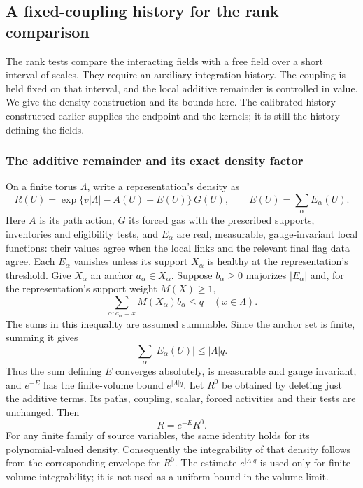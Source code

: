 \subsection{A fixed-coupling history for the rank comparison}
\label{sec:restarted-rank-history}

The rank tests compare the interacting fields with a free field over a
short interval of scales. They require an auxiliary integration history.
The coupling is held fixed on that interval, and the local additive
remainder is controlled in value. We give the density construction and
its bounds here. The calibrated history constructed earlier supplies the
endpoint and the kernels; it is still the history defining the fields.

\subsubsection{The additive remainder and its exact density factor}

On a finite torus $\Lambda$, write a representation's density as
\[
 R(U)=\exp\{v|\Lambda|-A(U)-E(U)\}\,G(U),
 \qquad E(U)=\sum_\alpha E_\alpha(U).
\]
Here $A$ is its path action, $G$ its forced gas with the prescribed
supports, inventories and eligibility tests, and $E_\alpha$ are real,
measurable, gauge-invariant local functions: their values agree when the local links and the relevant final flag data agree. Each $E_\alpha$ vanishes
unless its support $X_\alpha$ is healthy at the representation's threshold.
Give $X_\alpha$ an anchor $a_\alpha\in X_\alpha$. Suppose $b_\alpha\ge0$
majorizes $|E_\alpha|$ and, for the representation's support weight
$M(X)\ge1$,
\begin{equation}\label{eq:restart-anchored}
 \sum_{\alpha:a_\alpha=x}M(X_\alpha)b_\alpha\le q
 \quad(x\in\Lambda).
\end{equation}
The sums in this inequality are assumed summable. Since the anchor set
is finite, summing it gives
\[
 \sum_\alpha |E_\alpha(U)|\le |\Lambda|q.
\]
Thus the sum defining $E$ converges absolutely, is measurable and gauge
invariant, and $e^{-E}$ has the finite-volume bound $e^{|\Lambda|q}$.
Let $R^0$ be obtained by deleting just the additive terms. Its paths,
coupling, scalar, forced activities and their tests are unchanged. Then
\begin{equation}\label{eq:restart-white}
 R=e^{-E}R^0.
\end{equation}
For any finite family of source variables, the same identity holds for
its polynomial-valued density. Consequently the integrability of that
density follows from the corresponding envelope for $R^0$. The estimate
$e^{|\Lambda|q}$ is used only for finite-volume integrability; it is not
used as a uniform bound in the volume limit.

